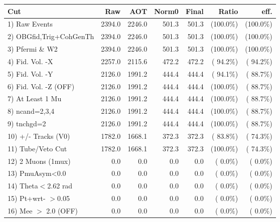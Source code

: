  \begin{table}[h!]\centering
 \begin{tabular}{||l||r|r|r|r|r|r||}
 \hline
 \hline
 Cut & Raw & AOT & Norm0 & Final & Ratio & eff.       \\
 \hline
  1) Raw Events           &       2394.0 &       2246.0 &        501.3 &        501.3 & (100.0\%) & (100.0\%) \\
  2) OBGfid,Trig+CohGenTh &       2394.0 &       2246.0 &        501.3 &        501.3 & (100.0\%) & (100.0\%) \\
  3) Pfermi \& W2         &       2394.0 &       2246.0 &        501.3 &        501.3 & (100.0\%) & (100.0\%) \\
  4) Fid. Vol. -X         &       2257.0 &       2115.6 &        472.2 &        472.2 & ( 94.2\%) & ( 94.2\%) \\
  5) Fid. Vol. -Y         &       2126.0 &       1991.2 &        444.4 &        444.4 & ( 94.1\%) & ( 88.7\%) \\
  6) Fid. Vol. -Z (OFF)   &       2126.0 &       1991.2 &        444.4 &        444.4 & (100.0\%) & ( 88.7\%) \\
  7) At Least 1 Mu        &       2126.0 &       1991.2 &        444.4 &        444.4 & (100.0\%) & ( 88.7\%) \\
  8) ncand=2,3,4          &       2126.0 &       1991.2 &        444.4 &        444.4 & (100.0\%) & ( 88.7\%) \\
  9) tnchgd=2             &       2126.0 &       1991.2 &        444.4 &        444.4 & (100.0\%) & ( 88.7\%) \\
 10) +/- Tracks (V0)      &       1782.0 &       1668.1 &        372.3 &        372.3 & ( 83.8\%) & ( 74.3\%) \\
 11) Tube/Veto Cut        &       1782.0 &       1668.1 &        372.3 &        372.3 & (100.0\%) & ( 74.3\%) \\
 12) 2 Muons (1mux)       &          0.0 &          0.0 &          0.0 &          0.0 & (  0.0\%) & (  0.0\%) \\
 13) PmuAsym<0.0          &          0.0 &          0.0 &          0.0 &          0.0 & (  0.0\%) & (  0.0\%) \\
 14) Theta$<$2.62 rad     &          0.0 &          0.0 &          0.0 &          0.0 & (  0.0\%) & (  0.0\%) \\
 15) Pt+wrt- $>$0.05      &          0.0 &          0.0 &          0.0 &          0.0 & (  0.0\%) & (  0.0\%) \\
 16) Mee $>$ 2.0  (OFF)   &          0.0 &          0.0 &          0.0 &          0.0 & (  0.0\%) & (  0.0\%) \\

\end{tabular}
\end{table}
